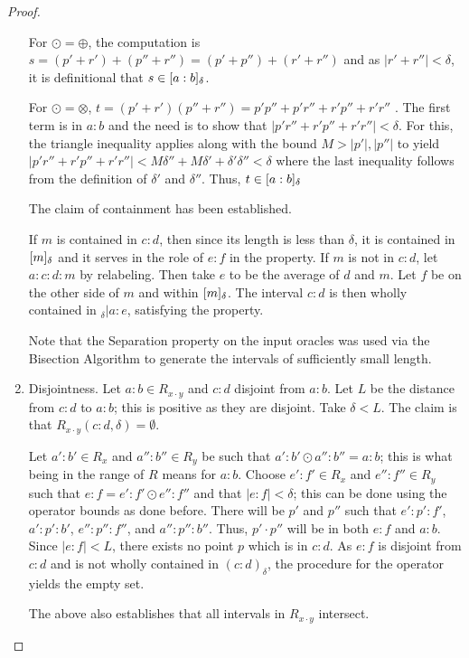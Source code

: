 \begin{proof}
\begin{enumerate}
    For $\odot = \oplus$, the computation is $s = (p'+r') + (p''+ r'') = (p' + p'') + (r' + r'')$ and as $|r'+r''| < \delta$, it is definitional that $s \in [a:b]_{\delta}$. 

    For $\odot = \otimes$, $t = (p'+r')(p''+ r'') = p'p'' + p'r'' + r' p'' + r' r''$ . The first term is in $a:b$ and the need is to show that $|p'r'' + r'p'' + r' r''|< \delta$. For this, the triangle inequality applies along with the bound $M > |p'|, |p''|$ to yield $|p'r'' + r'p'' + r' r''| < M \delta'' + M \delta' + \delta' \delta'' < \delta$ where the last inequality follows from the definition of $\delta'$ and $\delta''$.  Thus, $t \in [a:b]_{\delta} $

    The claim of containment has been established. 

    If $m$ is contained in $c:d$, then since its length is less than $\delta$, it is contained in $[m]_{\delta}$ and it serves in the role of $e:f$ in the property. If $m$ is not in $c:d$, let $a:c:d:m$ by relabeling. Then take $e$ to be the average of $d$ and $m$. Let $f$ be on the other side of $m$ and within $[m]_{\delta}$. The interval $c:d$ is then wholly contained in ${}_\delta |a:e$, satisfying the property. 

    Note that the Separation property on the input oracles was used via the Bisection Algorithm to generate the intervals of sufficiently small length. 
    
    \item Disjointness. Let $a:b \in R_{x\cdot y}$ and $c:d$ disjoint from $a:b$. Let $L$ be the distance from $c:d$ to $a:b$; this is positive as they are disjoint. Take $\delta < L$. The claim is that $R_{x \cdot y} (c:d, \delta) = \emptyset$. 
    
    Let $a':b' \in R_x$ and $a'':b'' \in R_y$ be such that $a':b' \odot a'':b'' = a:b$; this is what being in the range of $R$ means for $a:b$. Choose $e':f' \in R_x$ and $e'':f'' \in R_y$ such that $e:f = e':f' \odot e'' : f'' $ and that $|e:f| < \delta$; this can be done using the operator bounds as done before.  There will be $p'$ and $p''$ such that $e':p':f'$, $a':p':b'$, $e'':p'':f''$, and $a'':p'':b''$. Thus, $p' \cdot p''$ will be in both $e:f$ and $a:b$. Since $|e:f|< L$, there exists no point $p$ which is in $c:d$. As $e:f$ is disjoint from $c:d$ and is not wholly contained in $(c:d)_\delta$, the procedure for the operator yields the empty set. 

    The above also establishes that all intervals in $R_{x \cdot y}$ intersect. 


\end{enumerate}
\end{proof}
